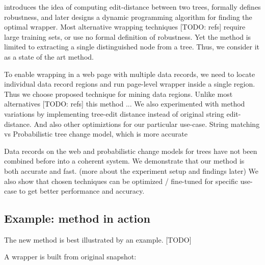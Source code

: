 \cite{DBLP:journals/pvldb/ParameswaranDGR11} introduces the idea of computing edit-distance between two trees, formally defines robustness, and later designs a dynamic programming algorithm for finding the optimal wrapper. Most alternative wrapping techniques [TODO: refs] require large training sets, or use no formal definition of robustness. Yet the method is limited to extracting a single distinguished node from a tree. Thus, we consider it as a state of the art method.

To enable wrapping in a web page with multiple data records, we need to locate individual data record regions and run page-level wrapper inside a single region. Thus we choose \cite{liu2009a} proposed technique for mining data regions. Unlike most alternatives [TODO: refs] this method ... We also experimented with method variations by implementing tree-edit distance instead of original string edit-distance. And also other optimiztions for our particular use-case.
String matching vs Probabilistic tree change model, which is more accurate



Data records on the web and probabilistic change models for trees have not been combined before into a coherent system. We demonstrate that our method is both accurate and fast. (more about the experiment setup and findings later) We also show that chosen techniques can be optimized / fine-tuned for specific use-case to get better performance and accuracy.



\subsection{Example: method in action}

The new method is best illustrated by an example. [TODO]

A wrapper is built from original snapshot:

